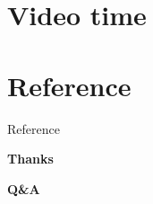 \documentclass[aspectratio=169]{beamer}
\begin{document}
\section{Video time}

\section{Reference}

\begin{frame}[allowframebreaks]{Reference}

   \printbibliography[heading=none]
 
\end{frame}

\begin{frame}{}
  \textbf{Thanks}
  
  \textbf{Q\&A}
\end{frame}
\end{document}
